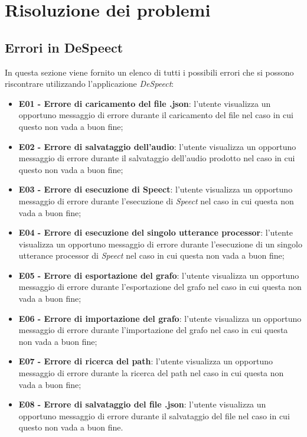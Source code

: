 \documentclass[openany,12pt,a4paper]{report}
\begin{document}
	\chapter{Risoluzione dei problemi}
	
	\section{Errori in DeSpeect}
	In questa sezione viene fornito un elenco di tutti i possibili errori che si possono riscontrare utilizzando l’applicazione \textit{DeSpeect}:
	\begin{itemize}
		\item \textbf{E01 - Errore di caricamento del file .json}: l'utente visualizza un opportuno messaggio di errore durante il caricamento del file nel caso in cui questo non vada a buon fine; 
		\item \textbf{E02 - Errore di salvataggio dell'audio}: l'utente visualizza un opportuno messaggio di errore durante il salvataggio dell'audio prodotto nel caso in cui questo non vada a buon fine; 
		\item \textbf{E03 - Errore di esecuzione di Speect}: l'utente visualizza un opportuno messaggio di errore durante l'esecuzione di \textit{Speect} nel caso in cui questa non vada a buon fine;
		\item \textbf{E04 - Errore di esecuzione del singolo utterance processor}: l'utente visualizza un opportuno messaggio di errore durante l'esecuzione di un singolo utterance processor di \textit{Speect} nel caso in cui questa non vada a buon fine;
		\item \textbf{E05 - Errore di esportazione del grafo}: l'utente visualizza un opportuno messaggio di errore durante l'esportazione del grafo nel caso in cui questa non vada a buon fine;
		\item \textbf{E06 - Errore di importazione del grafo}: l'utente visualizza un opportuno messaggio di errore durante l'importazione del grafo nel caso in cui questa non vada a buon fine;
		\item \textbf{E07 - Errore di ricerca del path}: l'utente visualizza un opportuno messaggio di errore durante la ricerca del path nel caso in cui questa non vada a buon fine;
		\item \textbf{E08 - Errore di salvataggio del file .json}: l'utente visualizza un opportuno messaggio di errore durante il salvataggio del file nel caso in cui questo non vada a buon fine. 
	\end{itemize} 
	
\end{document}

